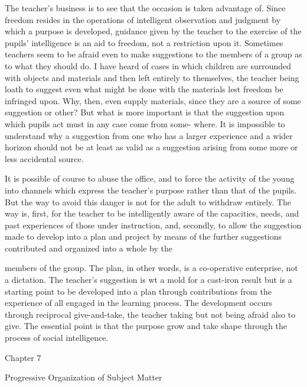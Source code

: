 The teacher's business is to see that the occasion is taken advantage of. Since freedom 
resides in the operations of intelligent observation and judgment by which a purpose is 
developed, guidance given by the teacher to the exercise of the pupils' intelligence is an 
aid to freedom, not a restriction upon it. Sometimes teachers seem to be afraid even to 
make suggestions to the members of a group as to what they should do. I have heard of 
cases in which children are surrounded with objects and materials and then left entirely to 
themselves, the teacher being loath to suggest even what might be done with the 
materials lest freedom be infringed upon. Why, then, even supply materials, since they 
are a source of some suggestion or other? But what is more important is that the 
suggestion upon which pupils act must in any case come from some- where. It is 
impossible to understand why a suggestion from one who has a larger experience and a 
wider horizon should not be at least as valid as a suggestion arising from some more or 
less accidental source. 

It is possible of course to abuse the office, and to force the activity of the young into 
channels which express the teacher's purpose rather than that of the pupils. But the way to 
avoid this danger is not for the adult to withdraw entirely. The way is, first, for the 
teacher to be intelligently aware of the capacities, needs, and past experiences of those 
under instruction, and, secondly, to allow the suggestion made to develop into a plan and 
project by means of the further suggestions contributed and organized into a whole by the 



members of the group. The plan, in other words, is a co-operative enterprise, not a 
dictation. The teacher's suggestion is wt a mold for a cast-iron result but is a starting point 
to be developed into a plan through contributions from the experience of all engaged in 
the learning process. The development occurs through reciprocal give-and-take, the 
teacher taking but not being afraid also to give. The essential point is that the purpose 
grow and take shape through the process of social intelligence. 


Chapter 7 

Progressive Organization of Subject Matter 

